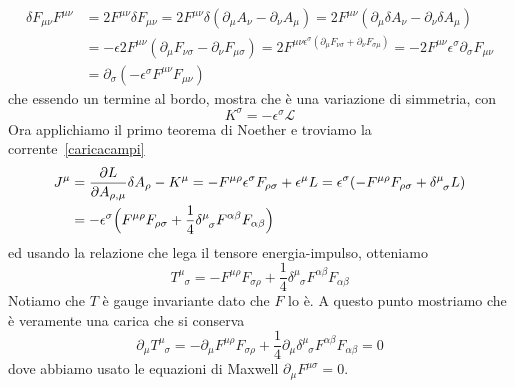 \begin{equation*}
\begin{aligned}
    \delta F_{\mu\nu} F^{\mu\nu} & = 2 F^{\mu\nu} \delta F_{\mu\nu} = 2 F^{\mu\nu} \delta (\partial_\mu A_\nu - \partial_\nu A_\mu) = 2 F^{\mu\nu} (\partial_\mu \delta A_\nu - \partial_\nu \delta A_\mu) \\ & = - \epsilon 2 F^{\mu\nu} (\partial_\mu F_{\nu\sigma}  - \partial_\nu F_{\mu\sigma}) = 2 F^{\mu\nu \epsilon^\sigma (\partial_\mu F_{\nu\sigma} + \partial_\nu F_{\sigma\mu})} = - 2 F^{\mu\nu} \epsilon^\sigma \partial_\sigma F_{\mu\nu} \\ & = \partial_\sigma (-\epsilon^\sigma F^{\mu\nu} F_{\mu\nu})
\end{aligned}
\end{equation*}
    che essendo un termine al bordo, mostra che è una variazione di simmetria, con 
\begin{equation*}
    K^\sigma = -\epsilon^\sigma \mathcal L
\end{equation*}
    Ora applichiamo il primo teorema di Noether e troviamo la corrente~\eqref{caricacampi} 
\begin{equation*}
\begin{aligned}
    J^\mu & = \pdv{L}{A_{\rho,\mu}} \delta A_\rho - K^\mu = - F^{\mu\rho} \epsilon^\sigma F_{\rho\sigma} + \epsilon^\mu L = \epsilon^\sigma (- F^{\mu\rho} F_{\rho \sigma} + \delta^\mu_{\phantom \mu \sigma} L ) \\ & = - \epsilon^\sigma \Big ( F^{\mu\rho} F_{\rho\sigma} + \frac{1}{4} \delta^\mu_{\phantom \mu \sigma} F^{\alpha \beta} F_{\alpha \beta} \Big)
\end{aligned}
\end{equation*}
    ed usando la relazione che lega il tensore energia-impulso, otteniamo 
\begin{equation*}
    T^\mu_{\phantom \mu \sigma} = - F^{\mu\rho} F_{\sigma\rho} + \frac{1}{4} \delta^\mu_{\phantom \mu \sigma} F^{\alpha \beta} F_{\alpha \beta}
\end{equation*}
    Notiamo che $T$ è gauge invariante dato che $F$ lo è. A questo punto mostriamo che è veramente una carica che si conserva
\begin{equation*}
    \partial_\mu T^\mu_{\phantom \mu \sigma} = - \partial_\mu F^{\mu\rho} F_{\sigma\rho} + \frac{1}{4} \partial_\mu \delta^\mu_{\phantom \mu \sigma} F^{\alpha \beta} F_{\alpha \beta} = 0
\end{equation*} 
    dove abbiamo usato le equazioni di Maxwell $\partial_\mu F^{\mu\sigma} = 0$.

